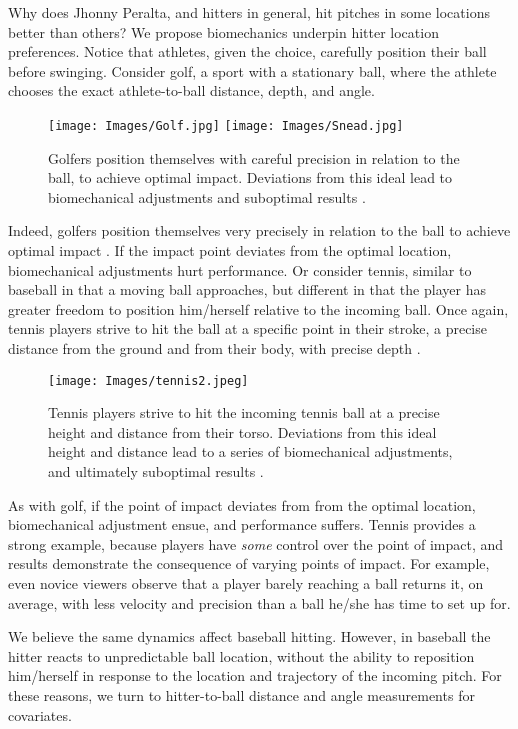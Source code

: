 Why does Jhonny Peralta, and hitters in general, hit pitches in some locations better than others? We propose biomechanics underpin hitter location preferences. Notice that athletes, given the choice, carefully position their ball before swinging. Consider golf, a sport with a stationary ball, where the athlete chooses the exact athlete-to-ball distance, depth, and angle. 
  \begin{figure}[H]
	\centering	
	\texttt{[image: Images/Golf.jpg]}
  \texttt{[image: Images/Snead.jpg]}
	\caption{Golfers position themselves with careful precision in relation to the ball, to achieve optimal impact. Deviations from this ideal lead to biomechanical adjustments and suboptimal results \citep{Cochran2005}.}
	\label{fig:golf}
	\end{figure}
Indeed, golfers position themselves very precisely in relation to the ball to achieve optimal impact \citep{Cochran2005}. If the impact point deviates from the optimal location, biomechanical adjustments hurt performance. Or consider tennis, similar to baseball in that a moving ball approaches, but different in that the player has greater freedom to position him/herself relative to the incoming ball. Once again, tennis players strive to hit the ball at a specific point in their stroke, a precise distance from the ground and from their body, with precise depth \citep{Elliott2006}. 
  \begin{figure}[H]
	\centering	
	\texttt{[image: Images/tennis2.jpeg]}
	\caption{Tennis players strive to hit the incoming tennis ball at a precise height and distance from their torso. Deviations from this ideal height and distance lead to a series of biomechanical adjustments, and ultimately suboptimal results \citep{Elliott2006}.}
	\end{figure}
As with golf, if the point of impact deviates from from the optimal location, biomechanical adjustment ensue, and performance suffers. Tennis provides a strong example, because players have {\it some} control over the point of impact, and results demonstrate the consequence of varying points of impact. For example, even novice viewers observe that a player barely reaching a ball returns it, on average, with less velocity and precision than a ball he/she has time to set up for.  

We believe the same dynamics affect baseball hitting. However, in baseball the hitter reacts to unpredictable ball location, without the ability to reposition him/herself in response to the location and trajectory of the incoming pitch. For these reasons, we turn to hitter-to-ball distance and angle measurements for covariates. 

